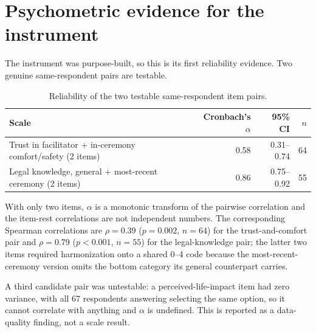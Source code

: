 \documentclass[12pt]{article}
\begin{document}
\section{Psychometric evidence for the instrument}

The instrument was purpose-built, so this is its first reliability evidence. Two genuine same-respondent pairs are testable.

\begin{table}[htbp]
\centering
\caption{Reliability of the two testable same-respondent item pairs.}
\begin{tabular}{lrrr}
\toprule
Scale & Cronbach's $\alpha$ & 95\% CI & $n$ \\
\midrule
Trust in facilitator + in-ceremony comfort/safety (2 items) & 0.58 & 0.31--0.74 & 64 \\
Legal knowledge, general + most-recent ceremony (2 items) & 0.86 & 0.75--0.92 & 55 \\
\bottomrule
\end{tabular}
\end{table}

\noindent
With only two items, $\alpha$ is a monotonic transform of the pairwise correlation and the item-rest
correlations are not independent numbers. The corresponding Spearman correlations are $\rho=0.39$
($p=0.002$, $n=64$) for the trust-and-comfort pair and $\rho=0.79$ ($p<0.001$, $n=55$) for the
legal-knowledge pair; the latter two items required harmonization onto a shared 0--4 code because the
most-recent-ceremony version omits the bottom category its general counterpart carries.

A third candidate pair was untestable: a perceived-life-impact item had zero variance, with all 67
respondents answering selecting the same option, so it cannot correlate with anything and $\alpha$ is
undefined. This is reported as a data-quality finding, not a scale result.
\end{document}
